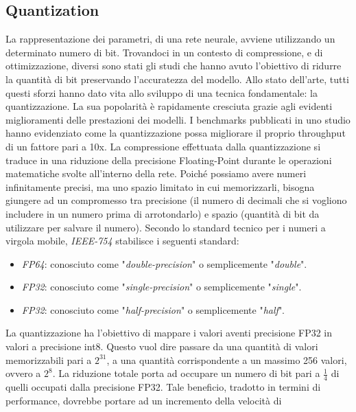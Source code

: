 \subsection{Quantization}
La rappresentazione dei parametri, di una rete neurale, avviene utilizzando 
un determinato numero di bit. Trovandoci in un contesto di compressione, e 
di ottimizzazione, diversi sono stati gli studi che hanno avuto l'obiettivo di 
ridurre la quantità di bit preservando l'accuratezza del modello. Allo stato 
dell'arte, tutti questi sforzi hanno dato vita allo sviluppo di una tecnica 
fondamentale: la quantizzazione. La sua popolarità è rapidamente cresciuta 
grazie agli evidenti miglioramenti delle prestazioni dei modelli. I benchmarks 
pubblicati in uno studio \cite{quantization_speed} hanno evidenziato come la quantizzazione possa 
migliorare il proprio throughput di un fattore pari a 10x. La compressione 
effettuata dalla quantizzazione si traduce in una riduzione della precisione 
Floating-Point durante le operazioni matematiche svolte all'interno della 
rete. Poiché possiamo avere numeri infinitamente precisi, ma uno spazio 
limitato in cui memorizzarli, bisogna giungere ad un compromesso tra 
precisione (il numero di decimali che si vogliono includere in un numero 
prima di arrotondarlo) e spazio (quantità di bit da utilizzare per salvare 
il numero). Secondo lo standard tecnico per i numeri a virgola mobile, 
\emph{IEEE-754} stabilisce i seguenti standard:
\begin{itemize}
    \item \emph{FP64}: conosciuto come "\emph{double-precision}" o semplicemente "\emph{double}". 
    \item \emph{FP32}: conosciuto come "\emph{single-precision}" o semplicemente "\emph{single}".
    \item \emph{FP32}: conosciuto come "\emph{half-precision}" o semplicemente "\emph{half}".
\end{itemize}
La quantizzazione ha l'obiettivo di mappare i valori aventi precisione FP32 
in valori a precisione int8. Questo vuol dire passare da una quantità di valori 
memorizzabili pari a $2^{31}$, a una quantità  corrispondente a un massimo 256 
valori, ovvero a $2^8$. La riduzione totale porta ad occupare un numero di bit 
pari a $\frac{1}{4}$ di quelli occupati dalla precisione FP32. Tale beneficio, tradotto in 
termini di performance, dovrebbe portare ad un incremento della velocità di 
